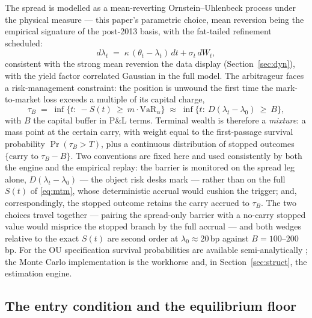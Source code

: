 \documentclass[11pt]{article}
\newcommand{\VaR}{\mathrm{VaR}}
\begin{document}
The spread is modelled as a mean-reverting Ornstein--Uhlenbeck process under the physical measure --- this paper's parametric choice, mean reversion being the empirical signature of the post-2013 basis, with the fat-tailed refinement scheduled:
\begin{equation}
d\lambda_t \;=\; \kappa\,(\theta_t-\lambda_t)\,dt+\sigma_t\,dW_t,
\label{eq:ou}
\end{equation}
consistent with the strong mean reversion the data display (Section~\ref{sec:dyn}), with the yield factor correlated Gaussian in the full model. The arbitrageur faces a risk-management constraint: the position is unwound the first time the mark-to-market loss exceeds a multiple of its capital charge,
\begin{equation}
\tau_B \;=\; \inf\{t:\ -S(t)\ \ge\ m\cdot\VaR_\alpha\}\;\approx\;\inf\{t:\ D(\lambda_t-\lambda_0)\ \ge\ B\},
\end{equation}
with $B$ the capital buffer in P\&L terms. Terminal wealth is therefore a \emph{mixture}: a mass point at the certain carry, with weight equal to the first-passage survival probability $\Pr(\tau_B>T)$, plus a continuous distribution of stopped outcomes $\{\text{carry to }\tau_B - B\}$. Two conventions are fixed here and used consistently by both the engine and the empirical replay: the barrier is monitored on the spread leg alone, $D(\lambda_t-\lambda_0)$ --- the object risk desks mark --- rather than on the full $S(t)$ of \eqref{eq:mtm}, whose deterministic accrual would cushion the trigger; and, correspondingly, the stopped outcome retains the carry accrued to $\tau_B$. The two choices travel together --- pairing the spread-only barrier with a no-carry stopped value would misprice the stopped branch by the full accrual --- and both wedges relative to the exact $S(t)$ are second order at $\lambda_0\approx20$\,bp against $B=100$--$200$\,bp. For the OU specification survival probabilities are available semi-analytically \citep{alili2005,linetsky2004}; the Monte Carlo implementation is the workhorse and, in Section~\ref{sec:struct}, the estimation engine.

\subsection{The entry condition and the equilibrium floor}\label{sec:entry}
\end{document}
